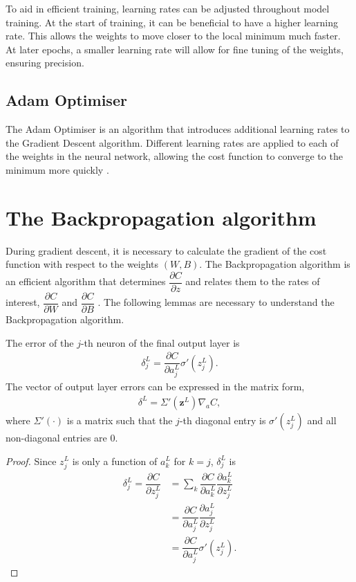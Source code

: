 To aid in efficient training, learning rates can be adjusted throughout model training. At the start of training, it can be beneficial to have a higher learning rate. This allows the weights to move closer to the local minimum much faster. At later epochs, a smaller learning rate will allow for fine tuning of the weights, ensuring precision.

\subsection*{Adam Optimiser}\label{nnets-adam}

The Adam Optimiser is an algorithm that introduces additional learning rates to the Gradient Descent algorithm. Different learning rates are applied to each of the weights in the neural network, allowing the cost function to converge to the minimum more quickly \cite{Kingma2014}.


\section{The Backpropagation algorithm}\label{nnets-backprop}

During gradient descent, it is necessary to calculate the gradient of the cost function with respect to the weights $(W,B)$. The Backpropagation algorithm is an efficient algorithm that determines $\dfrac{\partial C}{\partial z}$ and relates them to the rates of interest, $\dfrac{\partial C}{\partial W}$ and $\dfrac{\partial C}{\partial B}$ \cite{Nielson2015}. The following lemmas are necessary to understand the Backpropagation algorithm.


\begin{lemma}
	The error of the $j$-th neuron of the final output layer is
	\begin{align}
		\delta_j^L = \dfrac{\partial C}{\partial a_j^L}\sigma'(z_j^L).
	\end{align}
	The vector of output layer errors can be expressed in the matrix form,
	\begin{align}\label{nnets-bprop-eq1}
		\delta^L = \Sigma'(\mathbf{z}^L)\nabla_aC,
	\end{align}
where $\Sigma'(\cdot)$ is a matrix such that the $j$-th diagonal entry is $\sigma'(z_j^L)$ and all non-diagonal entries are 0.
\end{lemma}

\begin{proof}

Since $z_j^L$ is only a function of $a_k^L$ for $k = j$, $\delta_j^L$ is
	\begin{align}
		\delta_j^L = \dfrac{\partial C}{\partial z_j^L} & = \sum_k\dfrac{\partial C}{\partial a_k^L}\dfrac{\partial a_k^L}{\partial z_j^L} \\
		& = \dfrac{\partial C}{\partial a_j^L}\dfrac{\partial a_j^L}{\partial z_j^L}\\
		& = \dfrac{\partial C}{\partial a_j^L}\sigma'(z_j^L).
	\end{align}
\end{proof}

